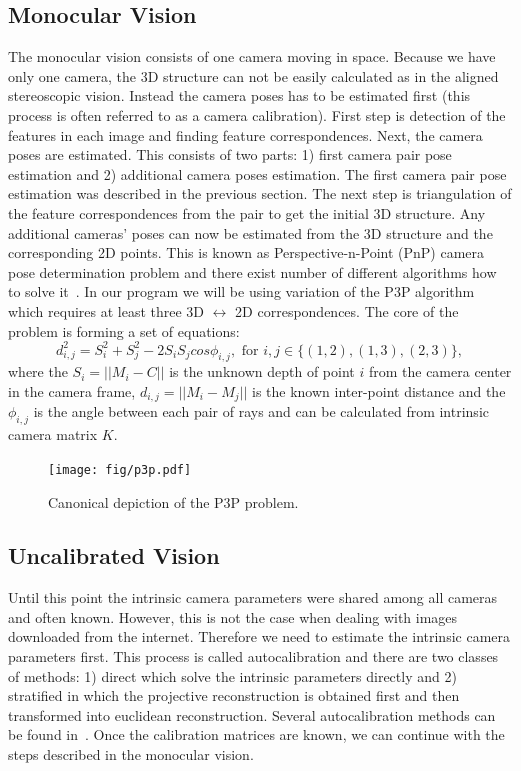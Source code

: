\subsection*{Monocular Vision}
The monocular vision consists of one camera moving in space. Because we have only one camera, the 3D structure can not be easily calculated as in the aligned stereoscopic vision. Instead the camera poses has to be estimated first (this process is often referred to as a camera calibration). First step is detection of the features in each image and finding feature correspondences. Next, the camera poses are estimated. This consists of two parts: 1) first camera pair pose estimation and 2) additional camera poses estimation. The first camera pair pose estimation was described in the previous section. The next step is triangulation of the feature correspondences from the pair to get the initial 3D structure. Any additional cameras' poses can now be estimated from the 3D structure and the corresponding 2D points. This is known as Perspective-n-Point (PnP) camera pose determination problem and there exist number of different algorithms how to solve it~\cite{Alismail_2011_6990}. In our program we will be using variation of the P3P algorithm which requires at least three 3D $\leftrightarrow$ 2D correspondences. The core of the problem is forming a set of equations:
\begin{equation}
	d_{i,j}^2 = S_i^2 + S_j^2 - 2S_i S_j cos \phi_{i,j}, \text{ for } i,j \in \{(1,2),(1,3),(2,3)\},
\end{equation}
where the $S_i = ||M_i-C||$ is the unknown depth of point $i$ from the camera center in the camera frame, $d_{i,j} = ||M_i-M_j||$ is the known inter-point distance  and the $\phi_{i,j}$ is the angle between each pair of rays and can be calculated from intrinsic camera matrix $K$. 

\begin{figure}[ht]
	\begin{center}
		\texttt{[image: fig/p3p.pdf]}
	\end{center}
	\caption{Canonical depiction of the P3P problem.}
	\label{fig:p3p}
\end{figure}

\subsection*{Uncalibrated Vision}
Until this point the intrinsic camera parameters were shared among all cameras and often known. However, this is not the case when dealing with images downloaded from the internet. Therefore we need to estimate the intrinsic camera parameters first. This process is called autocalibration and there are two classes of methods: 1) direct which solve the intrinsic parameters directly and 2) stratified in which the projective reconstruction is obtained first and then transformed into euclidean reconstruction. Several autocalibration methods can be found in~\cite{book:multiple_view_geometry}. Once the calibration matrices are known, we can continue with the steps described in the monocular vision.

